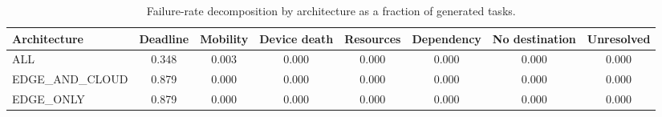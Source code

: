 \begin{table}
\centering
\small
\caption{Failure-rate decomposition by architecture as a fraction of generated tasks.}
\label{tab:p1-causes}
\begin{tabular}{lccccccc}
\toprule
Architecture & Deadline & Mobility & Device death & Resources & Dependency & No destination & Unresolved \\
\midrule
ALL & 0.348 & 0.003 & 0.000 & 0.000 & 0.000 & 0.000 & 0.000 \\
EDGE\_AND\_CLOUD & 0.879 & 0.000 & 0.000 & 0.000 & 0.000 & 0.000 & 0.000 \\
EDGE\_ONLY & 0.879 & 0.000 & 0.000 & 0.000 & 0.000 & 0.000 & 0.000 \\
\bottomrule
\end{tabular}
\par\vspace{2pt}{\footnotesize\raggedright Each row is the mean over the ten seeds of that architecture in the scale grid. Columns plus the success ratio leave an Unresolved remainder for tasks still in flight at the horizon.\par}
\end{table}
